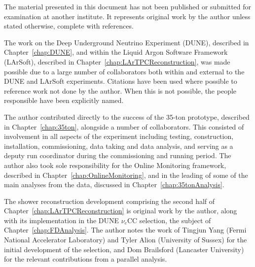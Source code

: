 
\begin{declaration}

  The material presented in this document has not been published or submitted for examination at another institute.  It represents original work by the author unless stated otherwise, complete with references.

  The work on the Deep Underground Neutrino Experiment (DUNE), described in Chapter~\ref{chap:DUNE}, and within the Liquid Argon Software Framework (LArSoft), described in Chapter~\ref{chap:LArTPCReconstruction}, was made possible due to a large number of collaborators both within and external to the DUNE and LArSoft experiments.  Citations have been used where possible to reference work not done by the author.  When this is not possible, the people responsible have been explicitly named.

  The author contributed directly to the success of the 35-ton prototype, described in Chapter~\ref{chap:35ton}, alongside a number of collaborators.  This consisted of involvement in all aspects of the experiment including testing, construction, installation, commissioning, data taking and data analysis, and serving as a deputy run coordinator during the commissioning and running period.  The author also took sole responsibility for the Online Monitoring framework, described in Chapter~\ref{chap:OnlineMonitoring}, and in the leading of some of the main analyses from the data, discussed in Chapter~\ref{chap:35tonAnalysis}.

  The shower reconstruction development comprising the second half of Chapter~\ref{chap:LArTPCReconstruction} is original work by the author, along with its implementation in the DUNE $\nu_e$CC selection, the subject of Chapter~\ref{chap:FDAnalysis}.  The author notes the work of Tingjun Yang (Fermi National Accelerator Laboratory) and Tyler Alion (University of Sussex) for the initial development of the selection, and Dom Brailsford (Lancaster University) for the relevant contributions from a parallel analysis.



\end{declaration}

